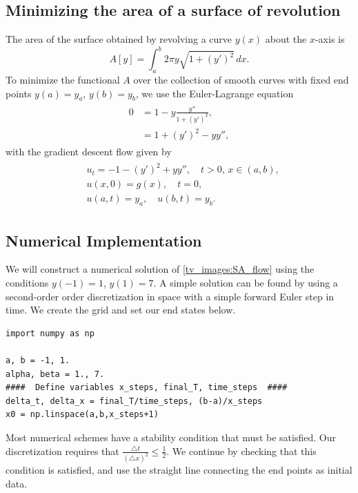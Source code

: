 \subsection*{Minimizing the area of a surface of revolution}
The area of the surface obtained by revolving a curve $y(x)$ about the $x$-axis is 
\[A[y] = \int_a^b 2 \pi y \sqrt{1 + (y')^2} \, dx.
\]
To minimize the functional $A$ over the collection of smooth curves with fixed end points $y(a) = y_a$, $y(b) = y_b$, we use the Euler-Lagrange equation 
\begin{align}
	\begin{split}
	0 &= 1 - y \frac{y''}{1 + (y')^2} , \\
	&= 1 + (y')^2 - y y'',
	\end{split}\label{tv_images:SA_EL_equation}
\end{align}
with the gradient descent flow given by 
\begin{align}
	\begin{split}
	&{ } u_t = -1 - (y')^2 + y y'',\quad t > 0,\, x \in (a,b), \\
	&{ } u(x,0) = g(x), \quad t = 0,\\
	&{ } u(a,t) = y_a, \quad u(b,t) = y_b.
	\end{split}\label{tv_images:SA_flow}
\end{align}

\subsection*{Numerical Implementation}
We will construct a numerical solution of \eqref{tv_images:SA_flow} using the conditions $y(-1) = 1$, $y(1) = 7$.
A simple solution can be found by using a second-order order discretization in space  with a simple forward Euler step in time. We create the grid and set our end states below.  
\begin{lstlisting}
import numpy as np

a, b = -1, 1.
alpha, beta = 1., 7.
####  Define variables x_steps, final_T, time_steps  ####
delta_t, delta_x = final_T/time_steps, (b-a)/x_steps
x0 = np.linspace(a,b,x_steps+1)
\end{lstlisting}

Most numerical schemes have a stability condition that must be satisfied. Our discretization requires that $\frac{\triangle t}{(\triangle x)^2} \leq \frac{1}{2}$.  
We continue by checking that this condition is satisfied, and use the straight line connecting the end points as initial data. 

